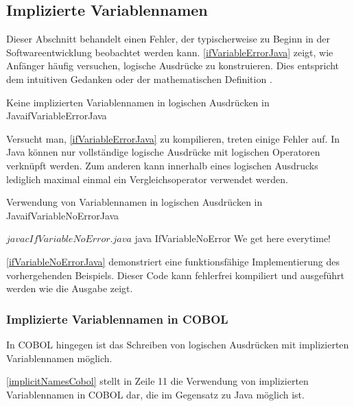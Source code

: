 \subsection{Implizierte Variablennamen}
Dieser Abschnitt behandelt einen Fehler, der typischerweise zu Beginn in der Softwareentwicklung beobachtet werden kann. \autoref{ifVariableErrorJava} zeigt, wie Anfänger häufig versuchen, logische Ausdrücke zu konstruieren. Dies entspricht dem intuitiven Gedanken  oder der mathematischen Definition .

\begin{codeWithCaption}{Keine implizierten Variablennamen in logischen Ausdrücken in Java}{ifVariableErrorJava}
\begin{shellwindow}
$ javac -Xmaxerrs 3 IfVariableError.java 
IfVariableError.java:4: error: > expected
        if (System.currentTimeMillis() > 0 && < Long.MAX_VALUE) {
                                                              ^
IfVariableError.java:4: error: ')' expected
        if (System.currentTimeMillis() > 0 && < Long.MAX_VALUE) {
                                                               ^
IfVariableError.java:8: error: illegal start of type
        if (0 < System.currentTimeMillis() < Long.MAX_VALUE) {
        ^
3 errors
\end{shellwindow}
\end{codeWithCaption}

Versucht man, \autoref{ifVariableErrorJava} zu kompilieren, treten einige Fehler auf. In Java können nur vollständige logische Ausdrücke mit logischen Operatoren verknüpft werden. Zum anderen kann innerhalb eines logischen Ausdrucks lediglich maximal einmal ein Vergleichsoperator verwendet werden. 

\begin{codeWithCaption}{Verwendung von Variablennamen in logischen Ausdrücken in Java}{ifVariableNoErrorJava}
\begin{shellwindow}
$ javac IfVariableNoError.java 
$ java IfVariableNoError
We get here everytime!
\end{shellwindow}
\end{codeWithCaption}

\autoref{ifVariableNoErrorJava} demonstriert eine funktionsfähige Implementierung des vorhergehenden Beispiels. Dieser Code kann fehlerfrei kompiliert und ausgeführt werden wie die Ausgabe zeigt.

\subsubsection*{Implizierte Variablennamen in COBOL}
In COBOL hingegen ist das Schreiben von logischen Ausdrücken mit implizierten Variablennamen möglich.


\autoref{implicitNamesCobol} stellt in Zeile 11 die Verwendung von implizierten Variablennamen in COBOL dar, die im Gegensatz zu Java möglich ist.